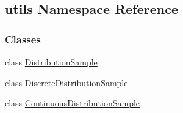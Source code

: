 \hypertarget{namespaceutils}{\subsection{utils Namespace Reference}
\label{namespaceutils}
}
\subsubsection*{Classes}
\begin{DoxyCompactItemize}
\item 
class \hyperlink{classutils_1_1DistributionSample}{Distribution\-Sample}
\item 
class \hyperlink{classutils_1_1DiscreteDistributionSample}{Discrete\-Distribution\-Sample}
\item 
class \hyperlink{classutils_1_1ContinuousDistributionSample}{Continuous\-Distribution\-Sample}
\end{DoxyCompactItemize}
